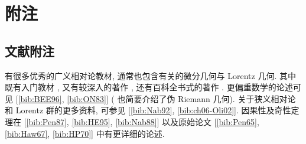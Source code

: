\section{附注}\label{sec:notes-on-relativity}

\subsection{文献附注}\label{subsec:relativity-literature}

有很多优秀的广义相对论教材, 通常也包含有关的微分几何与 Lorentz 几何. 其中既有入门教材 , 又有较深入的著作 , 还有百科全书式的著作 . 更偏重数学的论述可见 [\ref{bib:BEE96}, \ref{bib:ON83}] ( 也简要介绍了伪 Riemann 几何). 关于狭义相对论和 Lorentz 群的更多资料, 可参见 [\ref{bib:Nab92}, \ref{bib:ch06-Oli02}]. 因果性及奇性定理在 [\ref{bib:Pen87}, \ref{bib:HE95}, \ref{bib:Nab88}] 以及原始论文 [\ref{bib:Pen65}, \ref{bib:Haw67}, \ref{bib:HP70}] 中有更详细的论述.
